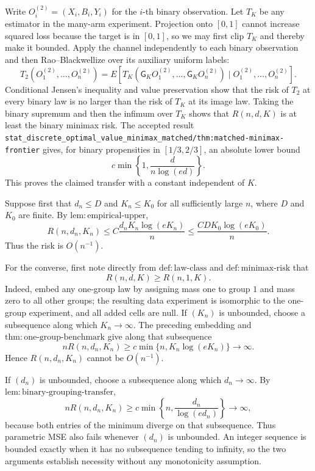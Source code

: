 Write \(O_i^{(2)}=(X_i,B_i,Y_i)\) for the \(i\)-th binary observation.  Let \(T_K\) be any estimator in the many-arm experiment.  Projection onto \([0,1]\) cannot increase squared loss because the target is in \([0,1]\), so we may first clip \(T_K\) and thereby make it bounded.  Apply the channel independently to each binary observation and then Rao--Blackwellize over its auxiliary uniform labels:
\[
 T_2(O_1^{(2)},\ldots,O_n^{(2)})
 =E[T_K(\mathsf G_KO_1^{(2)},\ldots,\mathsf G_KO_n^{(2)})
       \mid O_1^{(2)},\ldots,O_n^{(2)}].
\]
Conditional Jensen's inequality and value preservation show that the risk of \(T_2\) at every binary law is no larger than the risk of \(T_K\) at its image law.  Taking the binary supremum and then the infimum over \(T_K\) shows that \(R(n,d,K)\) is at least the binary minimax risk.  The accepted result \texttt{stat\_discrete\_optimal\_value\_minimax\_matched/thm:matched-minimax-frontier} gives, for binary propensities in \([1/3,2/3]\), an absolute lower bound
\[
 c\min\left\{1,\frac{d}{n\log(ed)}\right\}.
\]
This proves the claimed transfer with a constant independent of \(K\).

Suppose first that \(d_n\leq D\) and \(K_n\leq K_0\) for all sufficiently large \(n\), where \(D\) and \(K_0\) are finite.  By \(\mathrm{lem{:}empirical\text{-}upper}\),
\[
 R(n,d_n,K_n)
 \leq C\frac{d_nK_n\log(eK_n)}n
 \leq\frac{CDK_0\log(eK_0)}n.
\]
Thus the risk is \(O(n^{-1})\).

For the converse, first note directly from \(\mathrm{def{:}law\text{-}class}\) and \(\mathrm{def{:}minimax\text{-}risk}\) that
\[
 R(n,d,K)\geq R(n,1,K).
\]
Indeed, embed any one-group law by assigning mass one to group \(1\) and mass zero to all other groups; the resulting data experiment is isomorphic to the one-group experiment, and all added cells are null.  If \((K_n)\) is unbounded, choose a subsequence along which \(K_n\to\infty\).  The preceding embedding and \(\mathrm{thm{:}one\text{-}group\text{-}benchmark}\) give along that subsequence
\[
 nR(n,d_n,K_n)\geq c\min\{n,K_n\log(eK_n)\}\longrightarrow\infty.
\]
Hence \(R(n,d_n,K_n)\) cannot be \(O(n^{-1})\).

If \((d_n)\) is unbounded, choose a subsequence along which \(d_n\to\infty\).  By \(\mathrm{lem{:}binary\text{-}grouping\text{-}transfer}\),
\[
 nR(n,d_n,K_n)
 \geq c\min\left\{n,\frac{d_n}{\log(ed_n)}\right\}
 \longrightarrow\infty,
\]
because both entries of the minimum diverge on that subsequence.  Thus parametric MSE also fails whenever \((d_n)\) is unbounded.  An integer sequence is bounded exactly when it has no subsequence tending to infinity, so the two arguments establish necessity without any monotonicity assumption.

